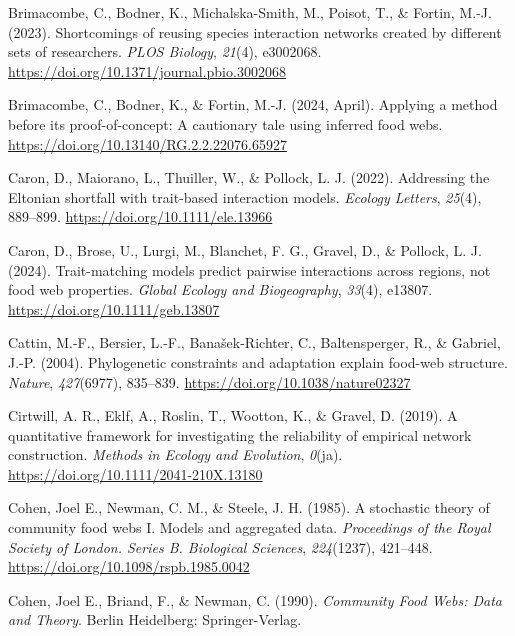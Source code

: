 \documentclass[
]{agujournal2019}
\newlength{\cslhangindent}
\newenvironment{CSLReferences}[2] %
 {\begin{list}{}{%
  \setlength{\itemindent}{0pt}
  \setlength{\leftmargin}{0pt}
  \setlength{\parsep}{0pt}
  \ifodd #1
   \setlength{\leftmargin}{\cslhangindent}
   \setlength{\itemindent}{-1\cslhangindent}
  \fi
  \setlength{\itemsep}{#2\baselineskip}}}
 {\end{list}}
\begin{document}
\begin{CSLReferences}{1}{0}
Brimacombe, C., Bodner, K., Michalska-Smith, M., Poisot, T., \& Fortin,
M.-J. (2023). Shortcomings of reusing species interaction networks
created by different sets of researchers. \emph{PLOS Biology},
\emph{21}(4), e3002068.
\url{https://doi.org/10.1371/journal.pbio.3002068}

Brimacombe, C., Bodner, K., \& Fortin, M.-J. (2024, April). Applying a
method before its proof-of-concept: {A} cautionary tale using inferred
food webs. \url{https://doi.org/10.13140/RG.2.2.22076.65927}

Caron, D., Maiorano, L., Thuiller, W., \& Pollock, L. J. (2022).
Addressing the {Eltonian} shortfall with trait-based interaction models.
\emph{Ecology Letters}, \emph{25}(4), 889--899.
\url{https://doi.org/10.1111/ele.13966}

Caron, D., Brose, U., Lurgi, M., Blanchet, F. G., Gravel, D., \&
Pollock, L. J. (2024). Trait-matching models predict pairwise
interactions across regions, not food web properties. \emph{Global
Ecology and Biogeography}, \emph{33}(4), e13807.
\url{https://doi.org/10.1111/geb.13807}

Cattin, M.-F., Bersier, L.-F., Banašek-Richter, C., Baltensperger, R.,
\& Gabriel, J.-P. (2004). Phylogenetic constraints and adaptation
explain food-web structure. \emph{Nature}, \emph{427}(6977), 835--839.
\url{https://doi.org/10.1038/nature02327}

Cirtwill, A. R., Eklf, A., Roslin, T., Wootton, K., \& Gravel, D.
(2019). A quantitative framework for investigating the reliability of
empirical network construction. \emph{Methods in Ecology and Evolution},
\emph{0}(ja). \url{https://doi.org/10.1111/2041-210X.13180}

Cohen, Joel E., Newman, C. M., \& Steele, J. H. (1985). A stochastic
theory of community food webs {I}. {Models} and aggregated data.
\emph{Proceedings of the Royal Society of London. Series B. Biological
Sciences}, \emph{224}(1237), 421--448.
\url{https://doi.org/10.1098/rspb.1985.0042}

Cohen, Joel E., Briand, F., \& Newman, C. (1990). \emph{Community {Food
Webs}: {Data} and {Theory}}. Berlin Heidelberg: Springer-Verlag.


\end{CSLReferences}
\end{document}
